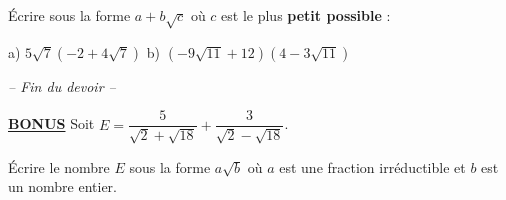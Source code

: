 \documentclass[12pt,a4paper]{exam}
\begin{document}
\begin{questions}
\vspace{10pt}
\question[1] Écrire sous la forme $a + b\sqrt{c}$ où $c$ est le plus \textbf{petit possible} :

\vspace{5pt}
\hspace{1.85cm} a) $5\sqrt{7}(-2 + 4\sqrt{7})$ \hspace{2cm} b) $(-9\sqrt{11} + 12)(4 - 3\sqrt{11})$

\vspace{40pt}
\begin{center}
    \textit{-- Fin du devoir --}
\end{center}

\vspace{40pt}
\question[2] \textbf{\underline{BONUS}} Soit $E = \dfrac{5}{\sqrt{2}+\sqrt{18}} + \dfrac{3}{\sqrt{2} - \sqrt{18}}$.

\vspace{5pt}
Écrire le nombre $E$ sous la forme $a\sqrt{b}$ où $a$ est une fraction irréductible et $b$ est un nombre entier.

\end{questions}
\end{document}
